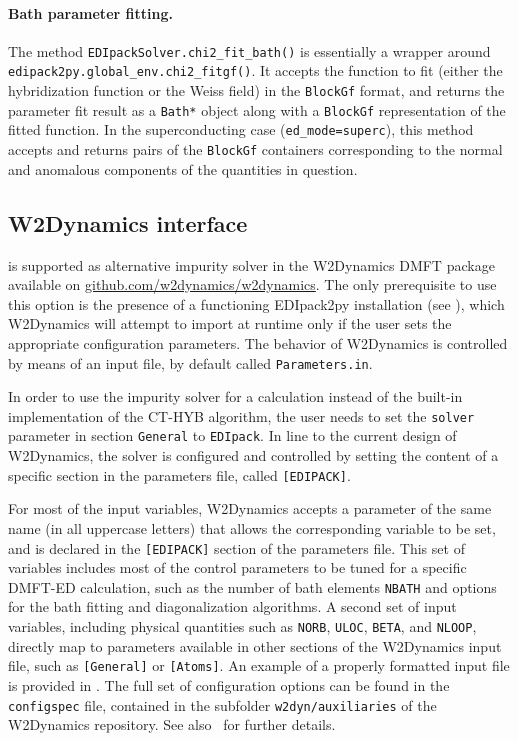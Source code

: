 \documentclass[edipack_sp.tex]{subfiles}
\begin{document}
\paragraph{{\bf Bath parameter fitting}.}
The method {\tt EDIpackSolver.chi2\_fit\_bath()} is essentially a wrapper around
{\tt edipack2py.global\_env.chi2\_fitgf()}. It accepts the function to fit (either
the hybridization function or the Weiss field) in the {\tt BlockGf} format,
and returns the parameter fit result as a {\tt Bath*} object along with a
{\tt BlockGf} representation of the fitted function. In the superconducting
case ({\tt ed\_mode=superc}), this method accepts and returns pairs of
the {\tt BlockGf} containers corresponding to the normal and anomalous 
components of the quantities in question.





\subsection{W2Dynamics interface}\label{sSecInteropW2DYN}
\NAME is supported as alternative impurity solver in the W2Dynamics DMFT package~\cite{Wallerberger2019CPC} available on \href{https://github.com/w2dynamics/w2dynamics}{github.com/w2dynamics/w2dynamics}. The only prerequisite to use this option is the presence of a functioning EDIpack2py installation (see ), which W2Dynamics will attempt to import at runtime only if the user sets the appropriate configuration parameters.
The  behavior of W2Dynamics is controlled by means of an input file, by default called
{\tt Parameters.in}.

In order to use the \NAME impurity solver for a calculation instead of the built-in implementation of the CT-HYB algorithm, the user needs to set the {\tt solver} parameter in section {\tt General} to {\tt EDIpack}. 
In line to the current design of W2Dynamics, the \NAME solver is configured and controlled by setting the content of a specific section in the parameters file, called {\tt [EDIPACK]}.

For most of the \NAME input variables, W2Dynamics accepts a parameter of the same name (in all uppercase letters) that allows the corresponding variable to be set, and is declared in the {\tt [EDIPACK]} section of the parameters file. This set of variables includes most of the control parameters to be tuned for a specific DMFT-ED calculation, such as the number of bath elements {\tt NBATH} and options for the bath fitting and diagonalization algorithms. 
%
A second set of input variables, including physical quantities such as {\tt NORB}, {\tt ULOC}, {\tt BETA}, and {\tt   NLOOP}, directly map to parameters available in other sections of the W2Dynamics input file, such as {\tt [General]} or {\tt [Atoms]}. An example of a properly formatted input file is provided in . The full set of configuration options can be found in the {\tt configspec} file, contained in the subfolder {\tt w2dyn/auxiliaries} of the W2Dynamics repository. See also~\cite{Wallerberger2019CPC}
for further details.
\end{document}
